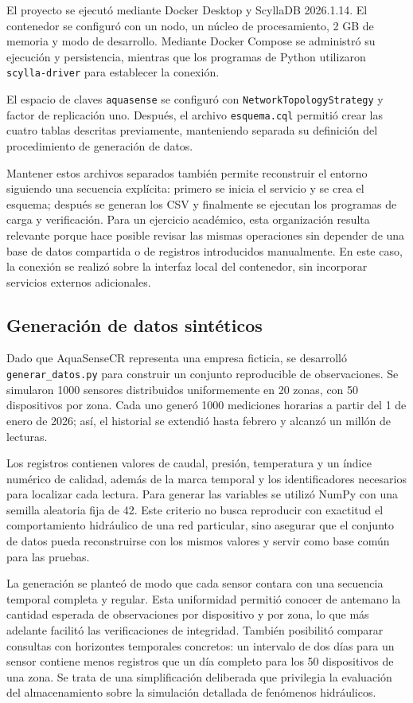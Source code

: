 \documentclass[conference]{IEEEtran}
\begin{document}
El proyecto se ejecutó mediante Docker Desktop y ScyllaDB 2026.1.14. El contenedor se configuró con un nodo, un núcleo de procesamiento, 2 GB de memoria y modo de desarrollo. Mediante Docker Compose se administró su ejecución y persistencia, mientras que los programas de Python utilizaron \texttt{scylla-driver} para establecer la conexión.

El espacio de claves \texttt{aquasense} se configuró con \texttt{NetworkTopologyStrategy} y factor de replicación uno. Después, el archivo \texttt{esquema.cql} permitió crear las cuatro tablas descritas previamente, manteniendo separada su definición del procedimiento de generación de datos.

Mantener estos archivos separados también permite reconstruir el entorno siguiendo una secuencia explícita: primero se inicia el servicio y se crea el esquema; después se generan los CSV y finalmente se ejecutan los programas de carga y verificación. Para un ejercicio académico, esta organización resulta relevante porque hace posible revisar las mismas operaciones sin depender de una base de datos compartida o de registros introducidos manualmente. En este caso, la conexión se realizó sobre la interfaz local del contenedor, sin incorporar servicios externos adicionales.

\subsection{Generación de datos sintéticos}

Dado que AquaSenseCR representa una empresa ficticia, se desarrolló \texttt{generar\_datos.py} para construir un conjunto reproducible de observaciones. Se simularon 1000 sensores distribuidos uniformemente en 20 zonas, con 50 dispositivos por zona. Cada uno generó 1000 mediciones horarias a partir del 1 de enero de 2026; así, el historial se extendió hasta febrero y alcanzó un millón de lecturas.

Los registros contienen valores de caudal, presión, temperatura y un índice numérico de calidad, además de la marca temporal y los identificadores necesarios para localizar cada lectura. Para generar las variables se utilizó NumPy con una semilla aleatoria fija de 42. Este criterio no busca reproducir con exactitud el comportamiento hidráulico de una red particular, sino asegurar que el conjunto de datos pueda reconstruirse con los mismos valores y servir como base común para las pruebas.

La generación se planteó de modo que cada sensor contara con una secuencia temporal completa y regular. Esta uniformidad permitió conocer de antemano la cantidad esperada de observaciones por dispositivo y por zona, lo que más adelante facilitó las verificaciones de integridad. También posibilitó comparar consultas con horizontes temporales concretos: un intervalo de dos días para un sensor contiene menos registros que un día completo para los 50 dispositivos de una zona. Se trata de una simplificación deliberada que privilegia la evaluación del almacenamiento sobre la simulación detallada de fenómenos hidráulicos.
\end{document}
